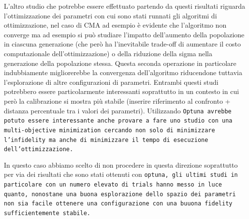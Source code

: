 L'altro studio che potrebbe essere effettuato partendo da questi risultati riguarda l'ottimizzazione dei parametri con cui sono stati runnati gli algoritmi di ottimizzazione, nel caso di CMA ad esempio è evidente che l'algoritmo non converge ma ad esempio si può studiare l'impatto dell'aumento della popolazione in ciascuna generazione (che però ha l'inevitabile trade-off di aumentare il costo computazionale dell'ottimizzazione) o della riduzione della sigma nella generazione della popolazione stessa.
Questa seconda operazione in particolare indubbiamente migliorerebbe la convergenza dell'algoritmo riducendone tuttavia l'esplorazione di altre configurazioni di parametri.
Entrambi questi studi potrebbero essere particolarmente interessanti soprattutto in un contesto in cui però la calibrazione si mostra più stabile (inserire riferimento al confronto + distanza percentuale tra i valori dei parametri).
Utilizzando \tt{Optuna} avrebbe potuto essere interessante anche provare a fare uno studio con una multi-objective minimization cercando non solo di minimizzare l'infidelity ma anche di minimizzare il tempo di esecuzione dell'ottimizzazione.

In questo caso abbiamo scelto di non procedere in questa direzione soprattutto per via dei risultati che sono stati ottenuti con \tt{optuna}, gli ultimi studi in particolare con un numero elevato di trials hanno messo in luce quanto, nonostane una buona esplorazione dello spazio dei parametri non sia facile ottenere una configurazione con una buuona fidelity sufficientemente stabile. 


